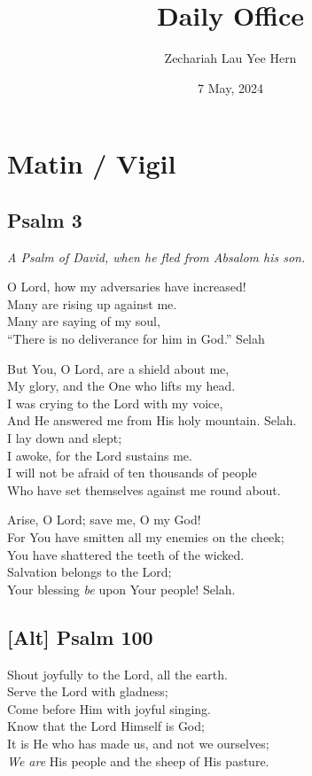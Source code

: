 \documentclass[14pt]{extbook}
\title{Daily Office}
\author{Zechariah Lau Yee Hern}
\date{7 May, 2024}
\begin{document}
\maketitle

\hypertarget{matin-vigil}{%
\section{Matin / Vigil}\label{matin-vigil}}

\hypertarget{psalm-3}{%
\subsection{Psalm 3}\label{psalm-3}}

\emph{A Psalm of David, when he fled from Absalom his son.}

O Lord, how my adversaries have increased!\\
Many are rising up against me.\\
Many are saying of my soul,\\
``There is no deliverance for him in God.'' Selah

But You, O Lord, are a shield about me,\\
My glory, and the One who lifts my head.\\
I was crying to the Lord with my voice,\\
And He answered me from His holy mountain. Selah.\\
I lay down and slept;\\
I awoke, for the Lord sustains me.\\
I will not be afraid of ten thousands of people\\
Who have set themselves against me round about.

Arise, O Lord; save me, O my God!\\
For You have smitten all my enemies on the cheek;\\
You have shattered the teeth of the wicked.\\
Salvation belongs to the Lord;\\
Your blessing \emph{be} upon Your people! Selah.

\hypertarget{alt-psalm-100}{%
\subsection{{[}Alt{]} Psalm 100}\label{alt-psalm-100}}

Shout joyfully to the Lord, all the earth.\\
Serve the Lord with gladness;\\
Come before Him with joyful singing.\\
Know that the Lord Himself is God;\\
It is He who has made us, and not we ourselves;\\
\emph{We are} His people and the sheep of His pasture.
\end{document}
